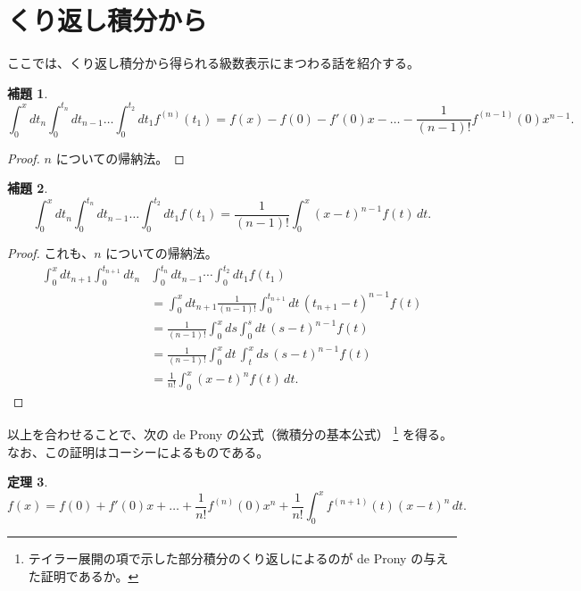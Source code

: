 \documentclass[a4paper]{jsarticle}
\newtheorem{Theorem}{定理}[section]
\newtheorem{Lemma}[Theorem]{補題}
\theoremstyle{definition}
\theoremstyle{remark}
\begin{document}
\section{くり返し積分から}
ここでは、くり返し積分から得られる級数表示にまつわる話を紹介する。

\begin{Lemma}
\[
\int_0^xdt_n \int_0^{t_n} dt_{n-1} \dots \int_0^{t_2}dt_1 f^{(n)}(t_1)
= f(x) - f(0) - f'(0)x - \dots - \frac{1}{(n-1)!} f^{(n-1)}(0)x^{n-1}. 
\]
\end{Lemma}

\begin{proof}
$n$ についての帰納法。
\end{proof} 

\begin{Lemma}
\[
\int_0^xdt_n \int_0^{t_n} dt_{n-1} \dots \int_0^{t_2}dt_1 f(t_1) 
= \frac{1}{(n-1)!} \int_0^x (x-t)^{n-1} f(t)\, dt.
\]
\end{Lemma}

\begin{proof}
これも、$n$ についての帰納法。
\begin{align*}
\int_0^x dt_{n+1} \int_0^{t_{n+1}} dt_n &\int_0^{t_n} dt_{n-1} \cdots \int_0^{t_2}dt_1 f(t_1)\\ 
&= \int_0^x dt_{n+1} \frac{1}{(n-1)!} \int_0^{t_{n+1}}dt\, (t_{n+1}-t)^{n-1} f(t)\\ 
&= \frac{1}{(n-1)!} \int_0^x ds \int_0^s dt\, (s-t)^{n-1} f(t)\\
&= \frac{1}{(n-1)!} \int_0^x dt\, \int_t^x ds\, (s-t)^{n-1} f(t)\\
&= \frac{1}{n!} \int_0^x (x-t)^n f(t)\, dt. 
\end{align*}
\end{proof}

以上を合わせることで、次の de Prony の公式（微積分の基本公式）
\footnote{
テイラー展開の項で示した部分積分のくり返しによるのが de Prony の与えた証明であるか。}
を得る。なお、この証明はコーシーによるものである。


\begin{Theorem}
\[
f(x) = f(0) + f'(0)x + \dots + \frac{1}{n!} f^{(n)}(0) x^n 
+ \frac{1}{n!} \int_0^x f^{(n+1)}(t)(x-t)^n\, dt. 
\]
\end{Theorem}
\end{document}
